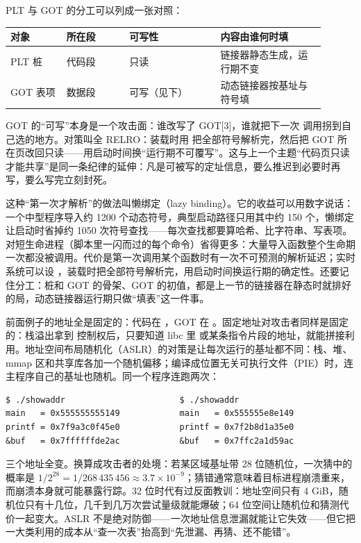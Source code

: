 PLT 与 GOT 的分工可以列成一张对照：

\begin{longtable}{L{0.16\linewidth}L{0.18\linewidth}L{0.26\linewidth}L{0.30\linewidth}}
\toprule
对象 & 所在段 & 可写性 & 内容由谁何时填 \\
\midrule
PLT 桩 & 代码段 & 只读 & 链接器静态生成，运行期不变 \\
GOT 表项 & 数据段 & 可写（见下） & 动态链接器按基址与符号填 \\
\bottomrule
\end{longtable}

GOT 的“可写”本身是一个攻击面：谁改写了 GOT[3]，谁就把下一次  调用拐到自己选的地方。对策叫全 RELRO：装载时用  把全部符号解析完，然后把 GOT 所在页改回只读——用启动时间换“运行期不可覆写”。这与上一个主题“代码页只读才能共享”是同一条纪律的延伸：凡是可被写的定址信息，要么推迟到必要时再写，要么写完立刻封死。

这种“第一次才解析”的做法叫懒绑定（lazy binding）。它的收益可以用数字说话：一个中型程序导入约 1200 个动态符号，典型启动路径只用其中约 150 个，懒绑定让启动时省掉约 1050 次符号查找——每次查找都要算哈希、比字符串、写表项。对短生命进程（脚本里一闪而过的每个命令）省得更多：大量导入函数整个生命期一次都没被调用。代价是第一次调用某个函数时有一次不可预测的解析延迟；实时系统可以设 ，装载时把全部符号解析完，用启动时间换运行期的确定性。还要记住分工：桩和 GOT 的骨架、GOT 的初值，都是上一节的链接器在静态时就排好的局，动态链接器运行期只做“填表”这一件事。

前面例子的地址全是固定的：代码在 ，GOT 在 。固定地址对攻击者同样是固定的：栈溢出拿到  控制权后，只要知道 libc 里  或某条指令片段的地址，就能拼接利用。地址空间布局随机化（ASLR）的对策是让每次运行的基址都不同：栈、堆、mmap 区和共享库各加一个随机偏移；编译成位置无关可执行文件（PIE）时，连主程序自己的基址也随机。同一个程序连跑两次：

\begin{lstlisting}
$ ./showaddr                       $ ./showaddr
main   = 0x555555555149            main   = 0x555555e8e149
printf = 0x7f9a3c0f45e0            printf = 0x7f2b8d1a35e0
&buf   = 0x7ffffffde2ac            &buf   = 0x7ffc2a1d59ac
\end{lstlisting}

三个地址全变。换算成攻击者的处境：若某区域基址带 28 位随机位，一次猜中的概率是 $1/2^{28}=1/268\,435\,456\approx3.7\times10^{-9}$；猜错通常意味着目标进程崩溃重来，而崩溃本身就可能暴露行踪。32 位时代有过反面教训：地址空间只有 4 GiB，随机位只有十几位，几千到几万次尝试量级就能爆破；64 位空间让随机位和猜测代价一起变大。ASLR 不是绝对防御——一次地址信息泄漏就能让它失效——但它把一大类利用的成本从“查一次表”抬高到“先泄漏、再猜、还不能错”。


